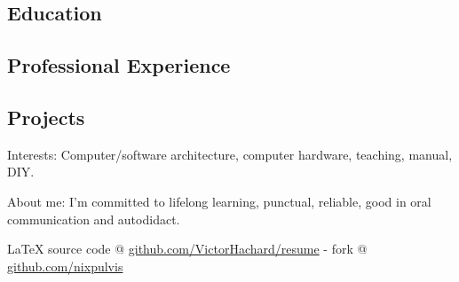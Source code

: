 \documentclass[10pt,a4paper]{article}
\newcommand{\latex}{\LaTeX\xspace}
\newenvironment{indentsection}[1]
{\begin{list}{}
  {\setlength{\leftmargin}{#1}} \item[]
}
{\end{list}}
\begin{document}


\vspace{-0.2em}


\subsection*{Education}


\subsection*{Professional Experience}


\subsection*{Projects}


\begin{indentsection}{\parindent}
\begin{description*}
\item[Interests:]
  Computer/software architecture, computer hardware, teaching,
  manual, DIY.
\item[About me:]
  I’m committed to lifelong learning, punctual, reliable,
  good in oral communication and autodidact.
\end{description*}
\end{indentsection}

\begin{center}
\footnotesize \latex source code @
\href{http://www.github.com/VictorHachard/resume}
{github.com/VictorHachard/resume} - fork @
\href{http://www.github.com/nixpulvis}
{github.com/nixpulvis}
\end{center}
\end{document}
